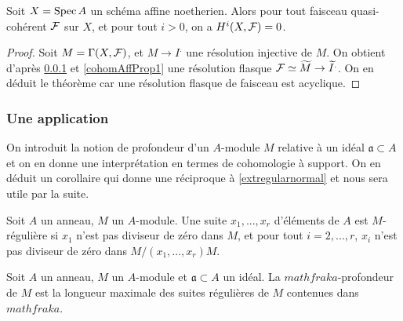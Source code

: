 \begin{thm}\label{cohomoaffine}
Soit $X=\operatorname{Spec} A$ un schéma affine noetherien. Alors pour tout faisceau quasi-cohérent $\mathcal{F}$ sur $X$, et pour tout $i>0$, on a $H^i(X,\mathcal{F})=0$. 
\end{thm}
\begin{proof}
Soit $M=\Gamma(X,\mathcal{F})$, et $M\rightarrow I^.$ une résolution injective de $M$. On obtient d'après \ref{} et \ref{cohomAffProp1} une résolution flasque $\mathcal{F}\simeq \widetilde{M}\rightarrow \widetilde{I}^.$. On en déduit le théorème car une résolution flasque de faisceau est acyclique.
\end{proof}

\subsubsection{Une application}

On introduit la notion de profondeur d'un $A$-module $M$ relative à un idéal $\mathfrak{a}\subset A$ et on en donne une interprétation en termes de cohomologie à support. On en déduit un corollaire qui donne une réciproque à \ref{extregularnormal} et nous sera utile par la suite.

\begin{defn}
Soit $A$ un anneau, $M$ un $A$-module. Une suite $x_1,...,x_r$ d'éléments de $A$ est $M$-régulière si $x_1$ n'est pas diviseur de zéro dans $M$, et pour tout $i=2,...,r$, $x_i$ n'est pas diviseur de zéro dans $M/(x_1,...,x_r)M$.
\end{defn}

\begin{defn}[Profondeur]
Soit $A$ un anneau, $M$ un $A$-module et $\mathfrak{a}\subset A$ un idéal. La $mathfrak{a}$-profondeur de $M$ est la longueur maximale des suites régulières de $M$ contenues dans $mathfrak{a}$.
\end{defn}



